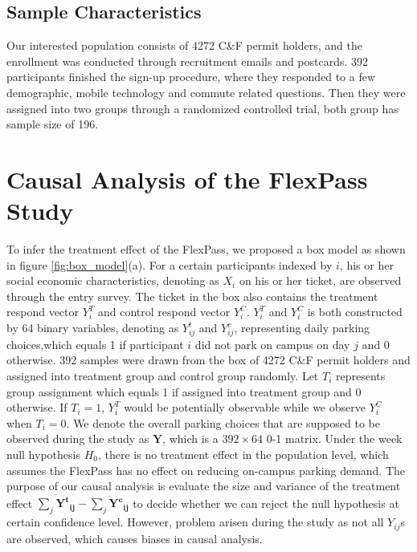 \documentclass[preprint,12pt]{elsarticle}
\begin{document}
\subsection{Sample Characteristics}

Our interested population consists of 4272 C\&F permit holders, and the enrollment was conducted through recruitment emails and postcards. 392 participants finished the sign-up procedure, where they responded to a few demographic, mobile technology and commute related questions. Then they were assigned into two groups through a randomized controlled trial, both group has sample size of 196. 

\section{Causal Analysis of the FlexPass Study}
To infer the treatment effect of the FlexPass, we proposed a box model as shown in figure \ref{fig:box_model}(a). For a certain participants indexed by $i$, his or her social economic characteristics, denoting as $X_i$ on his or her ticket, are observed through the entry survey. The ticket in the box also contains the treatment respond vector $Y_i^T$ and control respond vector $Y_i^C$. $Y_i^T$ and $Y_i^C$ is both constructed by 64 binary variables, denoting as $Y_{ij}^t$ and $Y_{ij}^c$, representing daily parking choices,which equals 1 if participant $i$ did not park on campus on day $j$ and 0 otherwise. 392 samples were drawn from the box of 4272 C\&F permit holders and assigned into treatment group and control group randomly. Let $T_i$ represents group assignment which equals 1 if assigned into treatment group and 0 otherwise. If $T_i=1$, $Y_i^T$ would be potentially observable while we observe $Y_i^C$ when $T_i=0$. We denote the overall parking choices that are supposed to be observed during the study as $\mathbf{Y}$, which is a $392\times 64$ 0-1 matrix. Under the week null hypothesis $H_0$, there is no treatment effect in the population level, which assumes the FlexPass has no effect on reducing on-campus parking demand. The purpose of our causal analysis is evaluate the size and variance of the treatment effect $\overline {\sum\limits_j \mathbf{{{Y^t}_{ij}}} }  - \overline {\sum\limits_j \mathbf{{{Y^c}_{ij}}} } $ to decide whether we can reject the null hypothesis at certain confidence level. However, problem arisen during the study as not all $Y_{ij}$s are observed, which causes biases in causal analysis. \\
\end{document}
